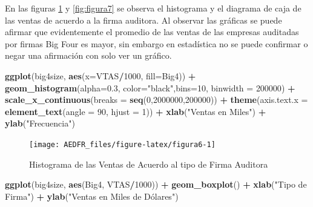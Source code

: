 \documentclass[letterpaper,]{book}
\newenvironment{Shaded}{\begin{snugshade}}{\end{snugshade}}
\newcommand{\DataTypeTok}[1]{\textcolor[rgb]{0.13,0.29,0.53}{#1}}
\newcommand{\DecValTok}[1]{\textcolor[rgb]{0.00,0.00,0.81}{#1}}
\newcommand{\FloatTok}[1]{\textcolor[rgb]{0.00,0.00,0.81}{#1}}
\newcommand{\KeywordTok}[1]{\textcolor[rgb]{0.13,0.29,0.53}{\textbf{#1}}}
\newcommand{\NormalTok}[1]{#1}
\newcommand{\OperatorTok}[1]{\textcolor[rgb]{0.81,0.36,0.00}{\textbf{#1}}}
\newcommand{\StringTok}[1]{\textcolor[rgb]{0.31,0.60,0.02}{#1}}
\begin{document}
En las figuras \ref{fig:figura6} y \ref{fig:figura7} se observa el histograma y el diagrama de caja de las ventas de acuerdo a la firma auditora. Al observar las gráficas se puede afirmar que evidentemente el promedio de las ventas de las empresas auditadas por firmas Big Four es mayor, sin embargo en estadística no se puede confirmar o negar una afirmación con solo ver un gráfico.

\begin{Shaded}
\begin{Highlighting}[]
\KeywordTok{ggplot}\NormalTok{(big4size, }\KeywordTok{aes}\NormalTok{(}\DataTypeTok{x=}\NormalTok{VTAS}\OperatorTok{/}\DecValTok{1000}\NormalTok{, }\DataTypeTok{fill=}\NormalTok{Big4)) }\OperatorTok{+}\StringTok{ }
\StringTok{  }\KeywordTok{geom_histogram}\NormalTok{(}\DataTypeTok{alpha=}\FloatTok{0.3}\NormalTok{, }\DataTypeTok{color=}\StringTok{"black"}\NormalTok{,}\DataTypeTok{bins=}\DecValTok{10}\NormalTok{, }\DataTypeTok{binwidth =} \DecValTok{200000}\NormalTok{) }\OperatorTok{+}
\StringTok{  }\KeywordTok{scale_x_continuous}\NormalTok{(}\DataTypeTok{breaks =} \KeywordTok{seq}\NormalTok{(}\DecValTok{0}\NormalTok{,}\DecValTok{2000000}\NormalTok{,}\DecValTok{200000}\NormalTok{)) }\OperatorTok{+}
\StringTok{  }\KeywordTok{theme}\NormalTok{(}\DataTypeTok{axis.text.x =} \KeywordTok{element_text}\NormalTok{(}\DataTypeTok{angle =} \DecValTok{90}\NormalTok{, }\DataTypeTok{hjust =} \DecValTok{1}\NormalTok{)) }\OperatorTok{+}
\StringTok{  }\KeywordTok{xlab}\NormalTok{(}\StringTok{"Ventas en Miles"}\NormalTok{) }\OperatorTok{+}\StringTok{ }\KeywordTok{ylab}\NormalTok{(}\StringTok{"Frecuencia"}\NormalTok{) }
\end{Highlighting}
\end{Shaded}

\begin{figure}[h!]

{\centering \texttt{[image: AEDFR\_files/figure-latex/figura6-1]} 

}

\caption{Histograma de las Ventas de Acuerdo al tipo de Firma Auditora}\label{fig:figura6}
\end{figure}

\begin{Shaded}
\begin{Highlighting}[]
\KeywordTok{ggplot}\NormalTok{(big4size, }\KeywordTok{aes}\NormalTok{(Big4, VTAS}\OperatorTok{/}\DecValTok{1000}\NormalTok{)) }\OperatorTok{+}\StringTok{ }
\StringTok{  }\KeywordTok{geom_boxplot}\NormalTok{() }\OperatorTok{+}\StringTok{ }\KeywordTok{xlab}\NormalTok{(}\StringTok{"Tipo de Firma"}\NormalTok{) }\OperatorTok{+}
\StringTok{  }\KeywordTok{ylab}\NormalTok{(}\StringTok{"Ventas en Miles de Dólares")}
\end{Highlighting}
\end{Shaded}
\end{document}
